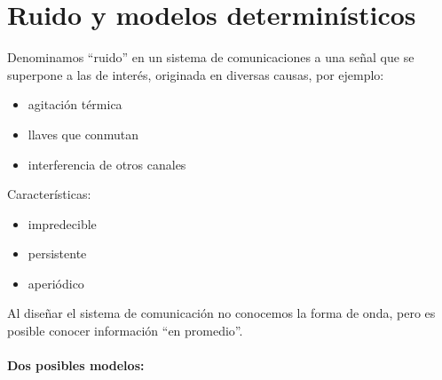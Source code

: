 \section{Ruido y modelos determinísticos}

Denominamos ``ruido''  en un sistema de comunicaciones a una señal
que se superpone a las de interés, originada en diversas causas,
por ejemplo:

    \begin{itemize}
        \item agitación térmica
        \item llaves que conmutan
        \item interferencia de otros canales
    \end{itemize}
Características:
    \begin{itemize}
        \item impredecible
        \item persistente
        \item aperiódico
    \end{itemize}

\begin{figure}[htb]
    \centering
\end{figure}
\FloatBarrier

Al diseñar el sistema de comunicación no conocemos la forma de
onda, pero es posible conocer información ``en promedio''.

\paragraph{Dos posibles modelos: }$\phantom{1}$

